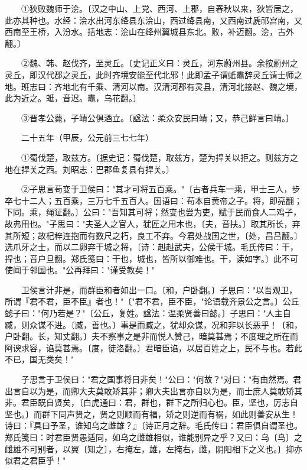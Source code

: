 　　①狄败魏师于浍。〔汉之中山、上党、西河、上郡，自春秋以来，狄皆居之，此亦其种也。水经：浍水出河东绛县东浍山，西过绛县南，又西南过虒祁宫南，又西南至王桥，入汾水。括地志：浍山在绛州翼城县东北。败，补迈翻。浍，古外翻。〕

　　②魏、韩、赵伐齐，至灵丘。〔史记正义曰：灵丘，河东蔚州县。余按蔚州之灵丘，即汉代郡之灵丘，此时齐境安能至代北邪！此即孟子谓蚔鼃辞灵丘请士师之地。班志曰：齐地北有千乘、清河以南。汉清河郡有灵县，清河北接赵、魏之境，此为近之。蚳，音迟。鼃，乌花翻。〕

　　③晋孝公薨，子靖公俱酒立。〔諡法：柔众安民曰靖；又，恭己鲜言曰靖。〕

　　二十五年（甲辰，公元前三七七年）

　　①蜀伐楚，取兹方。〔据史记：蜀伐楚，取兹方，楚为捍关以拒之。则兹方之地在捍关之西。刘昭志：巴郡鱼复县有捍关。〕

　　②子思言苟变于卫侯曰："其才可将五百乘。"〔古者兵车一乘，甲士三人，步卒七十二人；五百乘，三万七千五百人。国语曰：苟本自黄帝之子。将，即亮翻；下同。乘，绳证翻。〕公曰："吾知其可将；然变也尝为吏，赋于民而食人二鸡子，故弗用也。"子思曰："夫圣人之官人，犹匠之用木也，〔夫，音扶。〕取其所长，弃其所短；故杞梓连抱而有数尺之朽，良工不弃。今君处战国之世，〔处，昌吕翻。〕选爪牙之士，而以二卵弃干城之将，〔诗：赳赳武夫，公侯干城。毛氏传曰：干，捍也；音户旦翻。郑氏笺曰：干也，城也，皆所以御难也。干，读如字。〕此不可使闻于邻国也。"公再拜曰："谨受教矣！"

　　卫侯言计非是，而群臣和者如出一口。〔和，户卧翻。〕子思曰："以吾观卫，所谓『君不君，臣不臣』者也！"〔"君不君，臣不臣，"论语载齐景公之言。〕公丘懿子曰："何乃若是？"〔公丘，复姓。諡法：温柔贤善曰懿。〕子思曰："人主自臧，则众谋不进。〔臧，善也。〕事是而臧之，犹却众谋，况和非以长恶乎！〔和，户卧翻。长，知丈翻。〕夫不察事之是非而悦人赞己，暗莫甚焉；不度理之所在而阿谀求容，谄莫甚焉。〔度，徒洛翻。〕君暗臣谄，以居百姓之上，民不与也。若此不已，国无类矣！"

　　子思言于卫侯曰："君之国事将日非矣！"公曰："何故？"对曰："有由然焉。君出言自以为是，而卿大夫莫敢矫其非；卿大夫出言亦自以为是，而士庶人莫敢矫其非。君臣既自贤矣，〔白虎通曰：君，群也，群下之所归心也。臣，坚也，厉志自坚也。〕而群下同声贤之，贤之则顺而有福，矫之则逆而有祸，如此则善安从生！诗曰：『具曰予圣，谁知乌之雌雄？』〔诗正月之辞。毛氏传曰：君臣俱自谓圣也。郑氏笺曰：时君臣贤愚适同，如乌之雌雄相似，谁能别异之乎？又曰：乌〔鸟〕之雌雄不可别者，以翼〔知之〕，右掩左，雄，左掩右，雌，阴阳相下之义也。〕抑亦似君之君臣乎！"

